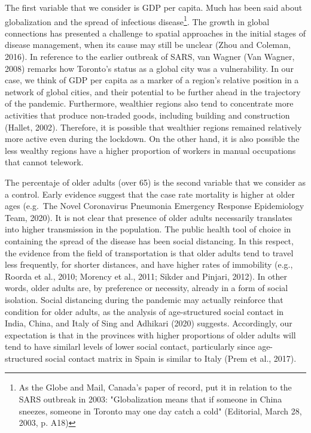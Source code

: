 \documentclass[]{elsarticle} %
\begin{document}
The first variable that we consider is GDP per capita. Much has been
said about globalization and the spread of infectious
disease\footnote{As the Globe and Mail, Canada's paper of record, put it in relation to the SARS outbreak in 2003: "Globalization means that if someone in China sneezes, someone in Toronto may one day catch a cold" (Editorial, March 28, 2003, p. A18)}.
The growth in global connections has presented a challenge to spatial
approaches in the initial stages of disease management, when its cause
may still be unclear (Zhou and Coleman, 2016). In reference to the
earlier outbreak of SARS, van Wagner (Van Wagner, 2008) remarks how
Toronto's status as a global city was a vulnerability. In our case, we
think of GDP per capita as a marker of a region's relative position in a
network of global cities, and their potential to be further ahead in the
trajectory of the pandemic. Furthermore, wealthier regions also tend to
concentrate more activities that produce non-traded goods, including
building and construction (Hallet, 2002). Therefore, it is possible that
wealthier regions remained relatively more active even during the
lockdown. On the other hand, it is also possible the less wealthy
regions have a higher proportion of workers in manual occupations that
cannot telework.

The percentaje of older adults (over 65) is the second variable that we
consider as a control. Early evidence suggest that the case rate
mortality is higher at older ages (e.g.~The Novel Coronavirus Pneumonia
Emergency Response Epidemiology Team, 2020). It is not clear that
presence of older adults necessarily translates into higher transmission
in the population. The public health tool of choice in containing the
spread of the disease has been social distancing. In this respect, the
evidence from the field of transportation is that older adults tend to
travel less frequently, for shorter distances, and have higher rates of
immobility (e.g., Roorda et al., 2010; Morency et al., 2011; Sikder and
Pinjari, 2012). In other words, older adults are, by preference or
necessity, already in a form of social isolation. Social distancing
during the pandemic may actually reinforce that condition for older
adults, as the analysis of age-structured social contact in India,
China, and Italy of Sing and Adhikari (2020) suggests. Accordingly, our
expectation is that in the provinces with higher proportions of older
adults will tend to have similarl levels of lower social contact,
particularly since age-structured social contact matrix in Spain is
similar to Italy (Prem et al., 2017).
\end{document}

